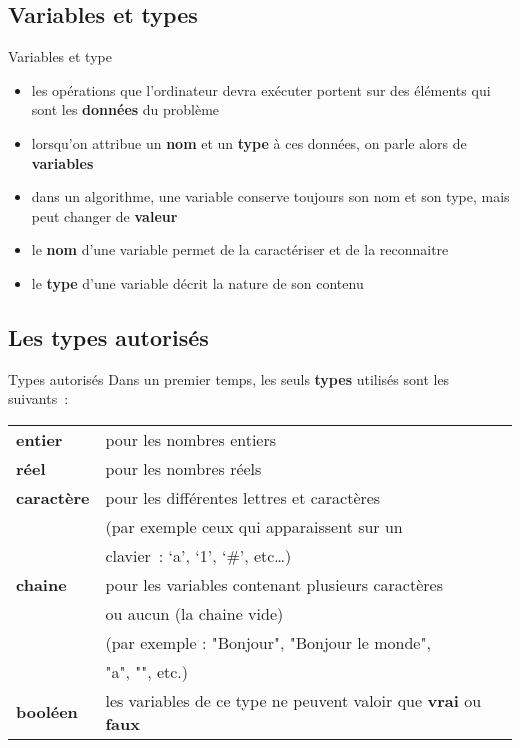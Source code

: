 \subsection{Variables et types}

\begin{frame}{Variables et type}
	\begin{itemize}
		\item les opérations que l’ordinateur devra exécuter portent
			sur des éléments qui sont les \textbf{données} du problème
		\item lorsqu’on attribue un \textbf{nom} et un \textbf{type} 
			à ces données, on parle	alors de \textbf{variables}
		\item dans un algorithme, une variable conserve
			toujours son nom et son type, mais peut changer de \textbf{valeur}
		\item le \textbf{nom }d’une variable permet de la caractériser et de la
			reconnaitre
		\item le \textbf{type} d’une variable décrit la nature de son contenu
	\end{itemize}
\end{frame}

\subsection{Les types autorisés}

\begin{frame}{Types autorisés}
	Dans un premier temps, les seuls \textbf{types} utilisés sont les
	suivants~:
	\begin{tabular}{p{1.6cm}|p{11.5cm}}
	\raggedleft  \textbf{entier} &
	 pour les nombres entiers\\
	\raggedleft  \textbf{réel} &
	 pour les nombres réels\\
	\raggedleft  \textbf{caractère} &
	 pour les différentes lettres et caractères \\
	{~} & (par exemple ceux qui apparaissent sur un \\
	{~} & clavier~: ‘a’, ‘1’, ‘\#’, etc…)\\
	\raggedleft  \textbf{chaine} &
	pour les variables contenant plusieurs
	caractères\\
	{~} & ou aucun (la chaine vide) \\
	{~} &	(par exemple : "Bonjour", "Bonjour le monde",  \\
	{~} &	"a", "", etc.)
	\\
	\raggedleft  \textbf{booléen} &
	 les variables de ce type ne peuvent valoir que
	\textbf{vrai} ou \textbf{faux}\\
	\end{tabular}
\end{frame}

